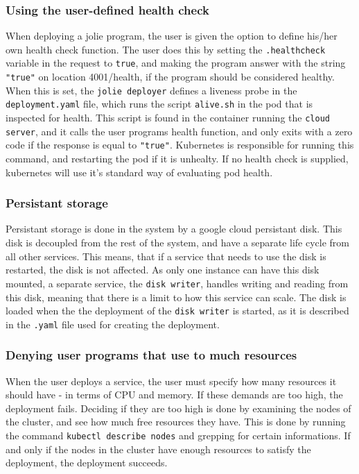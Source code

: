 \documentclass[Report.tex]{subfiles}
\begin{document}
\subsubsection{Using the user-defined health check}
When deploying a jolie program, the user is given the option to define his/her own health check function. The user does this by setting the {\tt .healthcheck} variable in the request to {\tt true}, and making the program answer with the string {\tt "true"} on location 4001/health, if the program should be considered healthy. When this is set, the {\tt jolie deployer} defines a liveness probe in the {\tt deployment.yaml} file, which runs the script {\tt alive.sh} in the pod that is inspected for health. This script is found in the container running the {\tt cloud server}, and it calls the user programs health function, and only exits with a zero code if the response is equal to {\tt "true"}. Kubernetes is responsible for running this command, and restarting the pod if it is unhealty. If no health check is supplied, kubernetes will use it's standard way of evaluating pod health.

\subsubsection{Persistant storage}
Persistant storage is done in the system by a google cloud persistant disk. This disk is decoupled from the rest of the system, and have a separate life cycle from all other services. This means, that if a service that needs to use the disk is restarted, the disk is not affected. As only one instance can have this disk mounted, a separate service, the {\tt disk writer}, handles writing and reading from this disk, meaning that there is a limit to how this service can scale. The disk is loaded when the the deployment of the {\tt disk writer} is started, as it is described in the {\tt .yaml} file used for creating the deployment.

\subsubsection{Denying user programs that use to much resources}
When the user deploys a service, the user must specify how many resources it should have - in terms of CPU and memory. If these demands are too high, the deployment fails. Deciding if they are too high is done by examining the nodes of the cluster, and see how much free resources they have. This is done by running the command {\tt kubectl describe nodes} and grepping for certain informations. If and only if the nodes in the cluster have enough resources to satisfy the deployment, the deployment succeeds.
\end{document}
